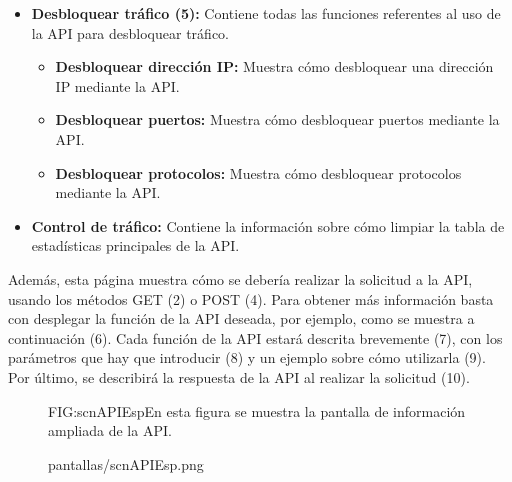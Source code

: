 \begin{itemize}
\begin{itemize}
\item \textbf{Bloquear puertos: }Muestra cómo bloquear puertos mediante la API.
\item \textbf{Bloquear protocolos: }Muestra cómo bloquear protocolos mediante la API.
\end{itemize}
\item \textbf{Desbloquear tráfico (5): }Contiene todas las funciones referentes al uso de la API para desbloquear tráfico.
\begin{itemize}
\item \textbf{Desbloquear dirección IP:} Muestra cómo desbloquear una dirección IP mediante la API.
\item \textbf{Desbloquear puertos: }Muestra cómo desbloquear puertos mediante la API.
\item \textbf{Desbloquear protocolos:} Muestra cómo desbloquear protocolos mediante la API.
\end{itemize}
\item \textbf{Control de tráfico: }Contiene la información sobre cómo limpiar la tabla de estadísticas principales de la API.
\end{itemize}

Además, esta página muestra cómo se debería realizar la solicitud a la API, usando los métodos GET (2) o POST (4). Para obtener más información basta con desplegar la función de la API deseada, por ejemplo, como se muestra a continuación (6). Cada función de la API estará descrita brevemente (7), con los parámetros que hay que introducir (8) y un ejemplo sobre cómo utilizarla (9). Por último, se describirá la respuesta de la API al realizar la solicitud (10).


\begin{figure}[Pantalla información ampliada de la API]{FIG:scnAPIEsp}{En esta figura se muestra la pantalla de información ampliada de la API.}
  \begin{image}{}{}{pantallas/scnAPIEsp.png}
  \end{image}
\end{figure}
